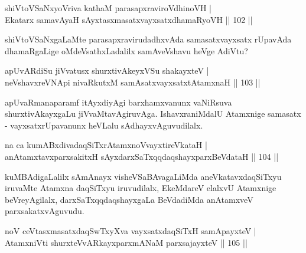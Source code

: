 
\begin{shl}
shiVtoVSaNxyoVriva kathaM parasapxraviroVdhinoVH |\\
Ekatarx samavAyaH sAyxtasxmasatxvayxsatxdhamaRyoVH \hfill || 102 ||
\end{shl}

\begin{artha}
shiVtoVSaNxgaLaMte parasapxravirudadhxvAda samasatxvayxsatx rUpavAda dhamaRgaLige oMdeVsathxLadalilx samAveVshavu heVge AdiVtu? 
\end{artha}


\begin{shl}
apUvARdiSu jiVvatusx shurxtivAkeyxVSu shakayxteV |\\
neVshavxreVNApi nivaRkutxM samAsatxvayxsatxtA\s \s tamxnaH \hfill || 103 ||
\end{shl}

\begin{artha}
apUvaRmanaparamf itAyxdiyAgi barxhamxvanunx vaNiRsuva shurxtivAkayxgaLu jiVvaMtavAgiruvAga. IshavxraniMdalU Atamxnige samasatx - vayxsatxrUpavanunx heVLalu sAdhayxvAguvudilalx.
\end{artha}


\begin{shl}
na ca kumABxdivadaqSiTxrAtamxnoV\s vayxtireVkataH |\\
anAtamxtavxparxsakitxH sAyxdarxSaTxqqdaqshayxparxBeVdataH \hfill || 104 ||
\end{shl}

\begin{artha}
kuMBAdigaLalilx sAmAnayx visheVSaBAvagaLiMda aneVkatavxdaqSiTxyu iruvaMte Atamxna daqSiTxyu iruvudilalx, EkeMdareV elalxvU Atamxnige beVreyAgilalx, darxSaTxqq\ndash daqshayxgaLa BeVdadiMda anAtamxveV parxsakatxvAguvudu.
\end{artha}


\begin{shl}
noV ceVtasxmasatxdaqSwTxyXva vayxsatxdaqSiTxH samApayxteV |\\
AtamxniVti shurxteVvARkayxparxmANaM parxsajayxteV \hfill || 105 ||
\end{shl}

